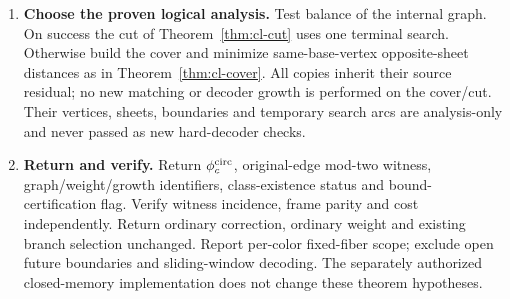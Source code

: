 \begin{enumerate}
\item \textbf{Choose the proven logical analysis.} Test balance of the
internal graph. On success the cut of Theorem~\ref{thm:cl-cut} uses one
terminal search. Otherwise build the cover and minimize same-base-vertex
opposite-sheet distances as in Theorem~\ref{thm:cl-cover}. All copies inherit
their source residual; no new matching or decoder growth is performed
on the cover/cut. Their vertices, sheets, boundaries and temporary search
arcs are analysis-only and never passed as new hard-decoder checks.
\item \textbf{Return and verify.} Return $\phi_c^{\rm circ}$, original-edge
mod-two witness, graph/weight/growth identifiers, class-existence status
and bound-certification flag. Verify witness incidence, frame parity and
cost independently. Return ordinary correction, ordinary weight and
existing branch selection unchanged. Report per-color fixed-fiber scope;
exclude open future boundaries and sliding-window decoding. The separately
authorized closed-memory implementation does not change these theorem hypotheses.
\end{enumerate}
